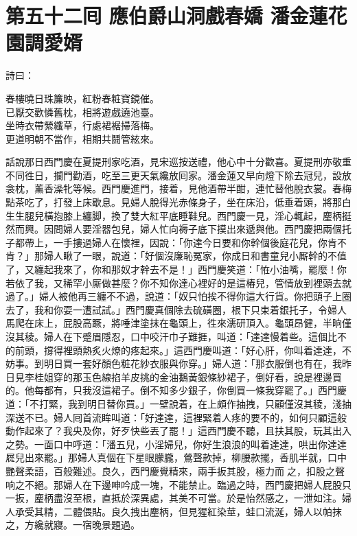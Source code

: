 
\chapter*{第五十二囘 應伯爵山洞戲春嬌 潘金蓮花園調愛婿}


詩曰：

\begin{myquote} 
春樓曉日珠簾映，紅粉春粧寶鏡催。\\已厭交歡憐舊枕，相將遊戲遶池臺。\\坐時衣帶縈纖草，行處裙裾掃落梅。\\更道明朝不當作，相期共鬪管絃來。
\end{myquote} 

話說那日西門慶在夏提刑家吃酒，見宋巡按送禮，他心中十分歡喜。夏提刑亦敬重不同徃日，{}攔門勸酒，吃至三更天氣纔放囘家。潘金蓮又早向燈下除去冠兒，設放衾枕，薰香澡牝等候。西門慶進門，接着，見他酒帶半酣，連忙替他脫衣裳。春梅點茶吃了，打發上床歇息。見婦人脫得光赤條身子，坐在床沿，低垂着頭，將那白生生腿兒橫抱膝上纏脚，{}換了雙大紅平底睡鞋兒。西門慶一見，淫心輒起，麈柄挺然而興。因問婦人要淫器包兒，婦人忙向褥子底下摸出來遞與他。西門慶把兩個托子都帶上，一手摟過婦人在懷裡，因說：「你達今日要和你幹個後庭花兒，你肯不肯？」那婦人瞅了一眼，說道：「好個沒廉恥冤家，你成日和書童兒小厮幹的不值了，又纏起我來了，你和那奴才幹去不是！」西門慶笑道：「恠小油嘴，罷麼！你若依了我，又稀罕小厮做甚麼？你不知你達心裡好的是這樁兒，管情放到裡頭去就過了。」{}婦人被他再三纏不不過，說道：「奴只怕挨不得你這大行貨。你把頭子上圈去了，我和你耍一遭試試。」西門慶真個除去硫磺圈，根下只束着銀托子，令婦人馬爬在床上，屁股高蹶，將唾津塗抹在龜頭上，徃來濡研頂入。龜頭昂健，半晌僅沒其稜。婦人在下蹙眉隱忍，口中咬汗巾子難捱，叫道：「達達慢着些。這個比不的前頭，撐得裡頭熱炙火燎的疼起來。」這西門慶叫道：「好心肝，你叫着達達，不妨事。到明日買一套好顏色粧花紗衣服與你穿。」婦人道：「那衣服倒也有在，我昨日見李桂姐穿的那玉色線掐羊皮挑的金油鵝黃銀條紗裙子，倒好看，說是裡邊買的。他每都有，只我沒這裙子。倒不知多少銀子，你倒買一條我穿罷了。」西門慶道：「不打緊，我到明日替你買。」一壁說着，在上頗作抽拽，只顧僅沒其稜，淺抽深送不已。婦人囘首流眸叫道：「好達達，這裡緊着人疼的要不的，如何只顧這般動作起來了？我央及你，好歹快些丟了罷！」這西門慶不聽，且扶其股，玩其出入之勢。一面口中呼道：「潘五兒，小淫婦兒，你好生浪浪的叫着達達，哄出你達達㞞兒出來罷。」那婦人真個在下星眼朦朧，鶯聲款掉，柳腰款擺，香肌半就，口中艷聲柔語，百般難述。良久，西門慶覺精來，兩手扳其股，極力而𢵞之，扣股之聲响之不絕。那婦人在下邊呻吟成一塊，不能禁止。臨過之時，西門慶把婦人屁股只一扳，麈柄盡沒至根，直抵於深異處，其美不可當。於是怡然感之，一泄如注。婦人承受其精，二體偎貼。良久拽出麈柄，但見猩紅染莖，蛙口流涎，婦人以帕抹之，方纔就寢。一宿晚景題過。

